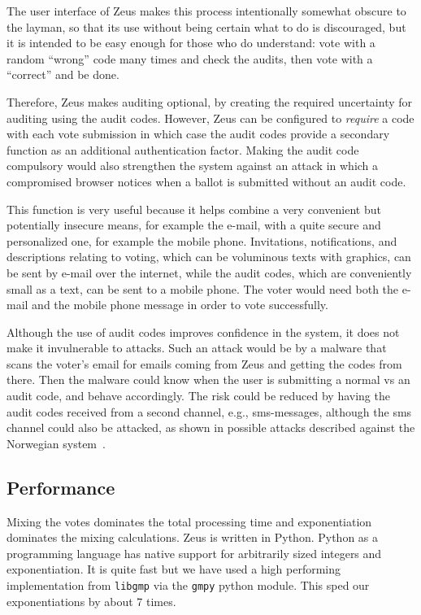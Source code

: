 \documentclass[letterpaper,10pt]{article}
\begin{document}
The user interface of Zeus makes this process intentionally somewhat
obscure to the layman, so that its use without being certain what to
do is discouraged, but it is intended to be easy enough for those who
do understand: vote with a random ``wrong'' code many times and check
the audits, then vote with a ``correct'' and be done.

Therefore, Zeus makes auditing optional, by creating the required
uncertainty for auditing using the audit codes.
However, Zeus can be configured to \emph{require} a code with each vote
submission in which case the audit codes provide a secondary function
as an additional authentication factor. Making the audit code
compulsory would also strengthen the system against an attack in which
a compromised browser notices when a ballot is submitted without an
audit code.

This function is very useful because it helps combine a very convenient
but potentially insecure means, for example the e-mail,
with a quite secure and personalized one, for example the mobile phone.
Invitations, notifications, and descriptions relating to voting,
which can be voluminous texts with graphics,
can be sent by e-mail over the internet,
while the audit codes, which are conveniently small as a text,
can be sent to a mobile phone.
The voter would need both the e-mail and the mobile phone message in
order to vote successfully.

Although the use of audit codes improves confidence in the system, it
does not make it invulnerable to attacks. Such an attack would be by a
malware that scans the voter's email for emails coming from Zeus and
getting the codes from there. Then the malware could know when the
user is submitting a normal vs an audit code, and behave accordingly.
The risk could be reduced by having the audit codes received from a
second channel, e.g., {\sc sms}-messages, although the {\sc sms}
channel could also be attacked, as shown in possible attacks described
against the Norwegian system~\cite{koenig:2013}.


\subsection{Performance}
\label{sec:performance}
Mixing the votes dominates the total processing time
and exponentiation dominates the mixing calculations.
Zeus is written in Python. 
Python as a programming language has native support for arbitrarily
sized integers and exponentiation.
It is quite fast but we have used a high performing implementation
from \texttt{libgmp} via the \texttt{gmpy} python module.
This sped our exponentiations by about 7 times.
\end{document}
